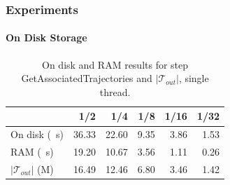 \documentclass{beamer}
\newcommand{\getAssociatedTrajectories}{GetAssociatedTrajectories\xspace}
\begin{document}
\begin{frame}
	\frametitle{Experiments}
	\framesubtitle{On Disk Storage}
	\begin{table}
		{
			\caption{On disk and RAM results for step \getAssociatedTrajectories and $|\mathcal{T}_{out}|$, single thread.}
			\begin{tabular}{|l||r|r|r|r|r|}
				\hline
				                          & 1/2   & 1/4   & 1/8  & 1/16 & 1/32 \\
				\hline
				On disk (\SI{}{s})        & 36.33 & 22.60 & 9.35 & 3.86 & 1.53 \\
				RAM (\SI{}{s})            & 19.20 & 10.67 & 3.56 & 1.11 & 0.26 \\
				$|\mathcal{T}_{out}|$ (M) & 16.49 & 12.46 & 6.80 & 3.46 & 1.42 \\
				\hline
			\end{tabular}
		}
	\end{table}
\end{frame}

\end{document}
